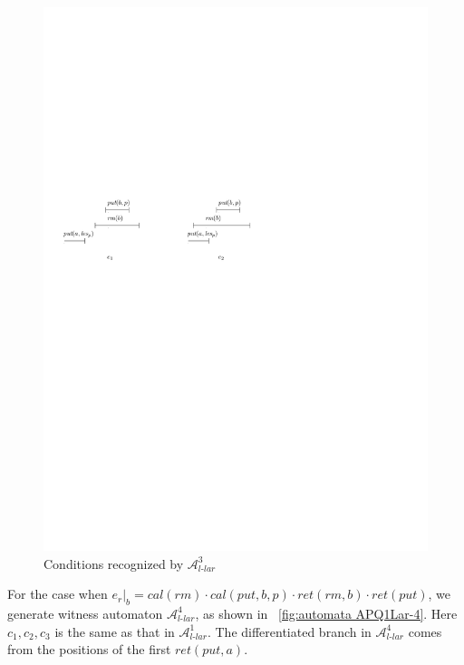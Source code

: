 \begin{figure}[htbp]
  \centering
  \includegraphics[width=0.7 \textwidth]{figures/PIC_HIS_PQ1Lar-rppr.pdf}
  \caption{Conditions recognized by $\mathcal{A}_{\textit{l-lar}}^3$}
  \label{fig:his for APQ1Lar-3}
\end{figure}


For the case when $e_r \vert_{b} = \textit{cal}(\textit{rm}) \cdot \textit{cal}(\textit{put},b,p) \cdot \textit{ret}(\textit{rm},b) \cdot \textit{ret}(\textit{put})$, we generate witness automaton $\mathcal{A}_{\textit{l-lar}}^4$, as shown in \figurename~\ref{fig:automata APQ1Lar-4}. Here $c_1,c_2,c_3$ is the same as that in $\mathcal{A}_{\textit{l-lar}}^1$. The differentiated branch in $\mathcal{A}_{\textit{l-lar}}^4$ comes from the positions of the first $\textit{ret}(\textit{put},a)$.

